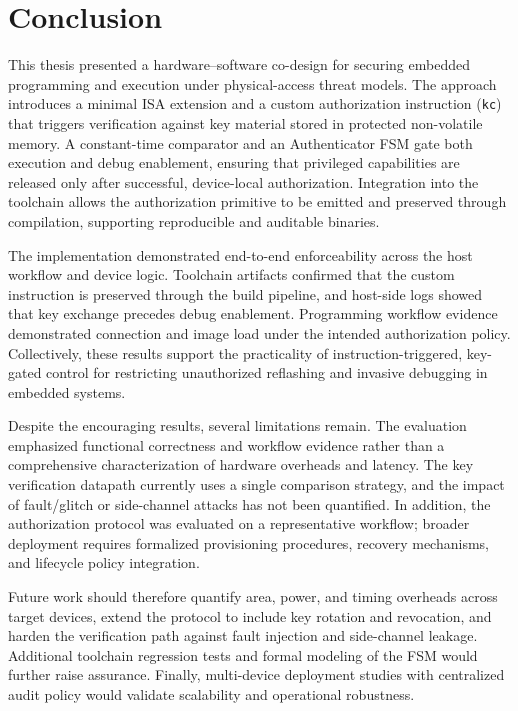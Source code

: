 \chapter{Conclusion}
\label{chapter6}

This thesis presented a hardware--software co-design for securing embedded programming and
execution under physical-access threat models. The approach introduces a minimal ISA extension
and a custom authorization instruction (\texttt{kc}) that triggers verification against key
material stored in protected non-volatile memory. A constant-time comparator and an
Authenticator FSM gate both execution and debug enablement, ensuring that privileged capabilities
are released only after successful, device-local authorization. Integration into the toolchain
allows the authorization primitive to be emitted and preserved through compilation, supporting
reproducible and auditable binaries.

The implementation demonstrated end-to-end enforceability across the host workflow and device
logic. Toolchain artifacts confirmed that the custom instruction is preserved through the build
pipeline, and host-side logs showed that key exchange precedes debug enablement. Programming
workflow evidence demonstrated connection and image load under the intended authorization policy.
Collectively, these results support the practicality of instruction-triggered, key-gated control
for restricting unauthorized reflashing and invasive debugging in embedded systems.

Despite the encouraging results, several limitations remain. The evaluation emphasized functional
correctness and workflow evidence rather than a comprehensive characterization of hardware
overheads and latency. The key verification datapath currently uses a single comparison strategy,
and the impact of fault/glitch or side-channel attacks has not been quantified. In addition, the
authorization protocol was evaluated on a representative workflow; broader deployment requires
formalized provisioning procedures, recovery mechanisms, and lifecycle policy integration.

Future work should therefore quantify area, power, and timing overheads across target devices,
extend the protocol to include key rotation and revocation, and harden the verification path
against fault injection and side-channel leakage. Additional toolchain regression tests and
formal modeling of the FSM would further raise assurance. Finally, multi-device deployment
studies with centralized audit policy would validate scalability and operational robustness.

